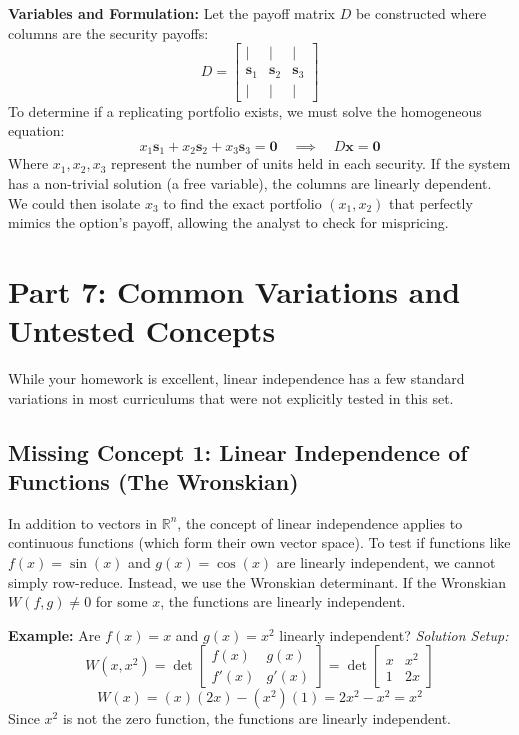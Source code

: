 \documentclass[11pt]{article}
\begin{document}
\textbf{Variables and Formulation:}
Let the payoff matrix $D$ be constructed where columns are the security payoffs:
\[ D = \begin{bmatrix} \vert & \vert & \vert \\ \mathbf{s}_1 & \mathbf{s}_2 & \mathbf{s}_3 \\ \vert & \vert & \vert \end{bmatrix} \]
To determine if a replicating portfolio exists, we must solve the homogeneous equation:
\[ x_1\mathbf{s}_1 + x_2\mathbf{s}_2 + x_3\mathbf{s}_3 = \mathbf{0} \quad \implies \quad D\mathbf{x} = \mathbf{0} \]
Where $x_1, x_2, x_3$ represent the number of units held in each security. If the system has a non-trivial solution (a free variable), the columns are linearly dependent. We could then isolate $x_3$ to find the exact portfolio $(x_1, x_2)$ that perfectly mimics the option's payoff, allowing the analyst to check for mispricing.

\newpage

\section{Part 7: Common Variations and Untested Concepts}

While your homework is excellent, linear independence has a few standard variations in most curriculums that were not explicitly tested in this set.

\subsection{Missing Concept 1: Linear Independence of Functions (The Wronskian)}
In addition to vectors in $\mathbb{R}^n$, the concept of linear independence applies to continuous functions (which form their own vector space). To test if functions like $f(x) = \sin(x)$ and $g(x) = \cos(x)$ are linearly independent, we cannot simply row-reduce. Instead, we use the Wronskian determinant.
If the Wronskian $W(f, g) \neq 0$ for some $x$, the functions are linearly independent.

\textbf{Example:} Are $f(x) = x$ and $g(x) = x^2$ linearly independent?
\textit{Solution Setup:}
\[ 
W(x, x^2) = \det \begin{bmatrix} f(x) & g(x) \\ f'(x) & g'(x) \end{bmatrix} = \det \begin{bmatrix} x & x^2 \\ 1 & 2x \end{bmatrix} 
\]
\[ 
W(x) = (x)(2x) - (x^2)(1) = 2x^2 - x^2 = x^2 
\]
Since $x^2$ is not the zero function, the functions are linearly independent.
\end{document}
